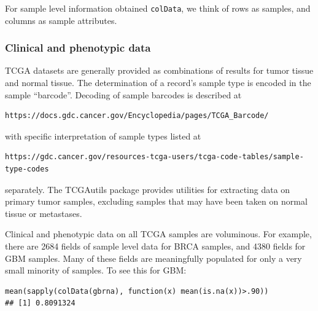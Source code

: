 \documentclass[graybox]{svmult}
\begin{document}
For sample level information obtained \texttt{colData}, we think of rows
as samples, and columns as sample attributes.


\subsubsection{Clinical and phenotypic data}
\label{clinical-and-phenotypic-data}

TCGA datasets are generally provided as combinations of
results for tumor tissue and normal tissue. The determination
of a record's sample type is encoded in the sample ``barcode''.
Decoding of sample barcodes is described at 

\begin{verbatim}
https://docs.gdc.cancer.gov/Encyclopedia/pages/TCGA_Barcode/
\end{verbatim}

\noindent
with specific interpretation of sample types listed 
at
{\small
\begin{verbatim}
https://gdc.cancer.gov/resources-tcga-users/tcga-code-tables/sample-type-codes
\end{verbatim}
}
\noindent
separately. The TCGAutils package provides utilities for extracting
data on primary tumor samples, excluding samples that may have been taken on
normal tissue or metastases.

Clinical and phenotypic data on all TCGA samples are voluminous. For example,
there are 2684 fields of sample level data for BRCA
samples, and 4380 fields for GBM samples. Many of these
fields are meaningfully populated for only a very small minority of samples.
To see this for GBM:


\begin{shaded}
\begin{verbatim}
mean(sapply(colData(gbrna), function(x) mean(is.na(x))>.90))
## [1] 0.8091324
\end{verbatim}
\end{shaded}
\end{document}
